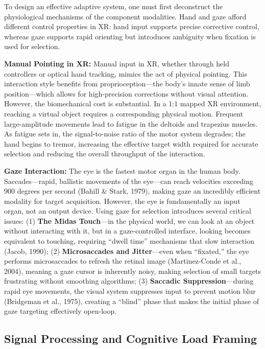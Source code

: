 \documentclass[
  11pt,
  11pt,
  letterpaper]{article}
\begin{document}
To design an effective adaptive system, one must first deconstruct the
physiological mechanisms of the component modalities. Hand and gaze
afford different control properties in XR: hand input supports precise
corrective control, whereas gaze supports rapid orienting but introduces
ambiguity when fixation is used for selection.

\textbf{Manual Pointing in XR:} Manual input in XR, whether through held
controllers or optical hand tracking, mimics the act of physical
pointing. This interaction style benefits from proprioception---the
body's innate sense of limb position---which allows for high-precision
corrections without visual attention. However, the biomechanical cost is
substantial. In a 1:1 mapped XR environment, reaching a virtual object
requires a corresponding physical motion. Frequent large-amplitude
movements lead to fatigue in the deltoids and trapezius muscles. As
fatigue sets in, the signal-to-noise ratio of the motor system degrades;
the hand begins to tremor, increasing the effective target width
required for accurate selection and reducing the overall throughput of
the interaction.

\textbf{Gaze Interaction:} The eye is the fastest motor organ in the
human body. Saccades---rapid, ballistic movements of the eye---can reach
velocities exceeding 900 degrees per second (Bahill \& Stark, 1979),
making gaze an incredibly efficient modality for target acquisition.
However, the eye is fundamentally an input organ, not an output device.
Using gaze for selection introduces several critical issues: (1)
\textbf{The Midas Touch}---in the physical world, we can look at an
object without interacting with it, but in a gaze-controlled interface,
looking becomes equivalent to touching, requiring ``dwell time''
mechanisms that slow interaction (Jacob, 1990); (2)
\textbf{Microsaccades and Jitter}---even when ``fixated,'' the eye
performs microsaccades to refresh the retinal image (Martinez-Conde et
al., 2004), meaning a gaze cursor is inherently noisy, making selection
of small targets frustrating without smoothing algorithms; (3)
\textbf{Saccadic Suppression}---during rapid eye movements, the visual
system suppresses input to prevent motion blur (Bridgeman et al., 1975),
creating a ``blind'' phase that makes the initial phase of gaze
targeting effectively open-loop.

\subsection{Signal Processing and Cognitive Load
Framing}\label{signal-processing-and-cognitive-load-framing}
\end{document}
